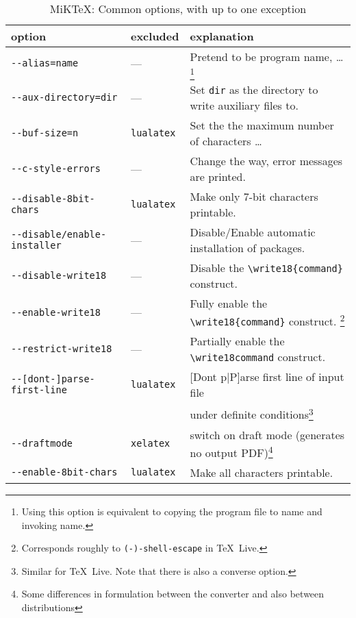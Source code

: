 \documentclass{article}
\newcommand{\lualatex}{\texttt{lualatex}}
\newcommand{\xelatex}{\texttt{xelatex}}
\newcommand{\texlive}{\TeX~Live}
\newcommand{\miktex}{MiKTeX}
\begin{document}
{\footnotesize
\begin{longtable}{|lll|}
  \toprule
  option & excluded & explanation \\
  \midrule
  \midrule
  \endfirsthead%
  \bottomrule
  \caption{\label{tab:latexOptionsCommonMiktex} \miktex: Common options, with up to one exception }
  \endlastfoot%
  \texttt{-{}-alias=name}            & ---         & Pretend to be program name, \dots\footnote%
{Using this option is equivalent to copying the program file to name and invoking name.} \\
\texttt{-{}-aux-directory=dir}       & ---         & 
Set \texttt{dir} as the directory to write auxiliary files to. \\
\texttt{-{}-buf-size=n}              & \lualatex{} & Set the the maximum number of characters \dots \\
\texttt{-{}-c-style-errors}          & ---         & Change the way, error messages are printed. \\
\texttt{-{}-disable-8bit-chars}      & \lualatex{} & Make only 7-bit characters printable. \\
\texttt{-{}-disable/enable-installer} & ---         & Disable/Enable automatic installation of packages. \\
\texttt{-{}-disable-write18}         & ---         & Disable the \texttt{\textbackslash{}write18\{command\}} construct.\\
\texttt{-{}-enable-write18}          & ---         & Fully enable the \texttt{\textbackslash{}write18\{command\}} construct. \footnote%
{Corresponds roughly to \texttt{(-)-shell-escape} in \texlive. } \\
\texttt{-{}-restrict-write18}        & ---         & Partially enable the \texttt{\textbackslash{}write18{command}} construct. \\
\texttt{-{}-[dont-]parse-first-line} & \lualatex{} & [Dont p|P]arse first line of input file \\
                                     &             & under definite conditions\footnote%
{Similar for \texlive. Note that there is also a converse option. } \\
\texttt{-{}-draftmode}               & \xelatex{}  & switch on draft mode (generates no output PDF)\footnote%
{Some differences in formulation between the converter and also between distributions} \\
\texttt{-{}-enable-8bit-chars}       & \lualatex{} & Make all characters printable. \\

\end{longtable}}
\end{document}
